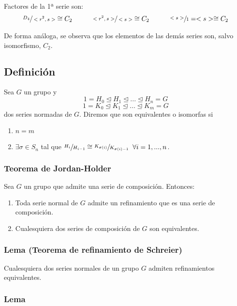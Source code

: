 \documentclass[11pt,a4paper]{article}
\begin{document}
Factores de la 1ª serie son:
$$\sfrac{D_{4}}{<r^{2},s>} \cong C_{2} \hspace{1cm} \sfrac{<r^{2},s>}{<s>} \cong C_{2} \hspace{1cm} \sfrac{<s>}{1} = <s> \cong C_{2}$$

De forma análoga, se observa que los elementos de las demás series son, salvo isomorfismo, $C_{2}$.

\subsection*{Definición}

Sea $G$ un grupo y
$$1 = H_{0} \unlhd H_{1} \unlhd ... \unlhd H_{n} = G$$
$$1 = K_{0} \unlhd K_{1} \unlhd ... \unlhd K_{m} = G$$
dos series normadas de $G$. Diremos que son equivalentes o isomorfas si
\begin{enumerate}[label = (\roman*)]
\item $n = m$
\item $\exists \sigma \in S_{n}$ tal que $\sfrac{H_{i}}{H_{i-1}} \cong \sfrac{K_{\sigma(i)}}{K_{\sigma(i)-1}} \hspace{0.2cm} \forall i = 1, ..., n$.
\end{enumerate}

\subsubsection*{Teorema de Jordan-Holder}

Sea $G$ un grupo que admite una serie de composición. Entonces:
\begin{enumerate}[label = \alph*)]
\item Toda serie normal de $G$ admite un refinamiento que es una serie de composición.
\item Cualesquiera dos series de composición de $G$ son equivalentes.
\end{enumerate}

\subsubsection*{Lema (Teorema de refinamiento de Schreier)}

Cualesquiera dos series normales de un grupo $G$ admiten refinamientos equivalentes.

\subsubsection*{Lema}
\end{document}
